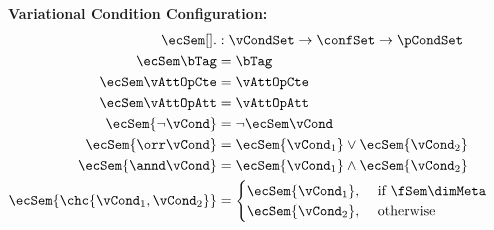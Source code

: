 \begin{figure}
\textbf{Variational Condition Configuration:}
\begin{alignat*}{1}
\ecSem [] . &: \vCondSet \to \confSet \to \pCondSet\\
%
\ecSem \bTag &= \bTag \\
%
\ecSem \vAttOpCte &= 
    \vAttOpCte\\
%
\ecSem \vAttOpAtt &= 
       \vAttOpAtt\\
%
\ecSem {\neg \vCond} &= \neg \ecSem \vCond\\
%
\ecSem {\orr \vCond} &= \ecSem {\vCond_1} \vee \ecSem {\vCond_2}\\
%
\ecSem {\annd \vCond} &= \ecSem {\vCond_1} \wedge \ecSem {\vCond_2}\\
%
\ecSem {\chc {\vCond_1, \vCond_2}} &=
	\begin{cases}
		\ecSem {\vCond_1}, &\text{ if } \fSem \dimMeta  \\
		\ecSem {\vCond_2}, &\text{ otherwise}
	\end{cases}
\end{alignat*}


\end{figure}
